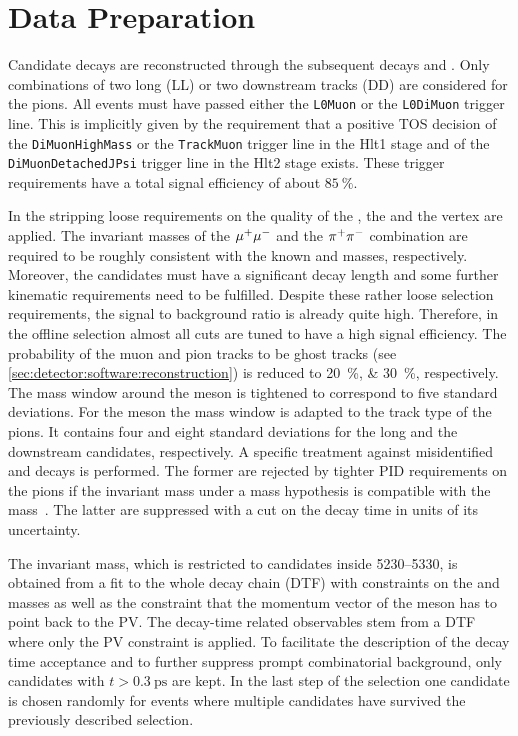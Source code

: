 
\section{Data Preparation}
\label{sec:bd2jpsiks:datapreparation}


Candidate \BdToJPsiKS decays are reconstructed through the subsequent decays
\mbox{\JPsiToMuMu} and \KSToPiPi. Only combinations of two long (LL) or two
downstream tracks (DD) are considered for the pions. All events must have passed
either the \texttt{L0Muon} or the \texttt{L0DiMuon} trigger line. This is
implicitly given by the requirement that a positive \jpsi TOS
decision of the \texttt{DiMuonHighMass} or the \texttt{TrackMuon} trigger line
in the Hlt1 stage and of the \texttt{DiMuonDetachedJPsi} trigger line in the
Hlt2 stage exists. These trigger requirements have a total signal efficiency
of about $\SI{85}{\percent}$.

In the stripping loose requirements on the quality of the \jpsi, the \KS and
the \Bd vertex are applied. The invariant masses of the ${\mu^+\mu^-}$ and the
${{\pi}^+}{{\pi}^-}$ combination are required to be roughly consistent with the known
\jpsi and \KS masses, respectively. Moreover, the \KS candidates must have a
significant decay length and some further kinematic requirements need to be
fulfilled. Despite these rather loose selection requirements, the signal to
background ratio is already quite high. Therefore, in the offline selection
almost all cuts are tuned to have a high signal efficiency. The probability of
the muon and pion tracks to be ghost tracks (see
\cref{sec:detector:software:reconstruction}) is reduced to
\SIlist{20;30}{\percent}, respectively. The mass window around the \jpsi meson
is tightened to correspond to five standard deviations. For the \KS meson the
mass window is adapted to the track type of the pions. It contains four and
eight standard deviations for the long and the downstream candidates,
respectively. A specific treatment against misidentified \LbToJPsiL and
\BdToJPsiKstar decays is performed. The former are rejected by tighter PID
requirements on the pions if the invariant mass under a \pion\proton mass
hypothesis is compatible with the \Lz mass~\cite{PDG2014}. The latter
are suppressed with a cut on the \KS decay time in units of its uncertainty.

The invariant \Bd mass, which is restricted to candidates inside
\SIrange{5230}{5330}{\MeVcc}, is obtained from a fit to the whole decay chain
(DTF) with constraints on the \jpsi and \KS masses as well as the constraint
that the momentum vector of the \Bd meson has to point back to the PV. The
decay-time related observables stem from a DTF where only the PV constraint is
applied. To facilitate the description of the decay time acceptance and to
further suppress prompt combinatorial background, only candidates with $t >
\SI{0.3}{\ps}$ are kept. In the last step of the selection one candidate is
chosen randomly for events where multiple candidates have survived the
previously described selection.
